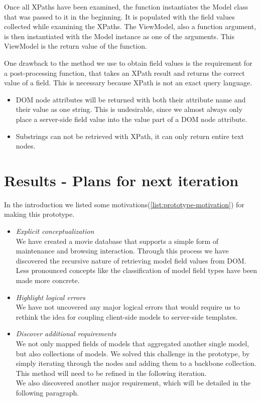 Once all XPaths have been examined, the function instantiates the Model class
that was passed to it in the beginning. It is populated with the field values
collected while examining the XPaths.
The ViewModel, also a function argument, is then instantiated with
the Model instance as one of the arguments.
This ViewModel is the return value of the function.

One drawback to the method we use to obtain field values is the requirement
for a post-processing function, that takes an XPath result and
returns the correct value of a field.
This is necessary because XPath is not an exact query language.
\begin{itemize}
	\item DOM node attributes will be returned with both their attribute name and
	their value as one string. This is undesirable, since we almost always only
	place a server-side field value into the value part of a DOM node attribute.
	\item Substrings can not be retrieved with XPath, it can only return entire
	text nodes.
\end{itemize}

\section{Results - Plans for next iteration}

In the introduction we listed some motivations(\ref{list:prototype-motivation})
for making this prototype.

\begin{itemize}
	\item \emph{Explicit conceptualization}\\
	We have created a movie database that supports a simple form of maintenance
	and browsing interaction. Through this process we have discovered the
	recursive nature of retrieving model field values from DOM.
	Less pronounced concepts like the classification of model field types have 
	been made more concrete.
	\item \emph{Highlight logical errors}\\
	We have not uncovered any major logical errors that would require us to
	rethink the idea for coupling client-side models to server-side templates.
	\item \emph{Discover additional requirements}\\
	We not only mapped fields of models that aggregated another single model,
	but also collections of models. We solved this challenge in the prototype,
	by simply iterating through the nodes and adding them to
	a backbone collection. This method will need to be refined in the following
	iteration.\\
	We also discovered another major requirement, which will be detailed in the
	following paragraph.
\end{itemize}

